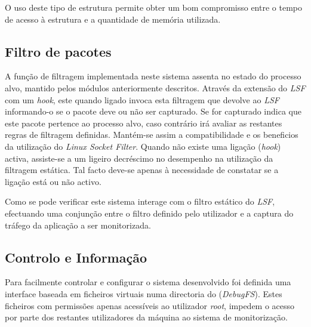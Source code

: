   O uso deste tipo de estrutura permite obter um bom compromisso entre o tempo de acesso à estrutura e a quantidade de memória utilizada.


\subsection{Filtro de pacotes}
\label{sub:packet_filter}

A função de filtragem implementada neste sistema assenta no estado do processo alvo, mantido pelos módulos anteriormente descritos.
Através da extensão do \textit{LSF} com um \textit{hook}, este quando ligado invoca esta filtragem que devolve ao \textit{LSF} informando-o se o pacote deve ou não ser capturado.
Se for capturado indica que este pacote pertence ao processo alvo, caso contrário irá avaliar as restantes regras de filtragem definidas.
Mantém-se assim a compatibilidade e os beneficios da utilização do \textit{Linux Socket Filter}.
Quando não existe uma ligação (\textit{hook}) activa, assiste-se a um ligeiro decréscimo no desempenho na utilização da filtragem estática.
Tal facto deve-se apenas à necessidade de constatar se a ligação está ou não activo.

Como se pode verificar este sistema interage com o filtro estático do \textit{LSF}, efectuando uma conjunção entre o filtro definido pelo utilizador e a captura do tráfego da aplicação a ser monitorizada.


\subsection{Controlo e Informação}
\label{sub:data_information}

Para facilmente controlar e configurar o sistema desenvolvido foi definida uma interface baseada em ficheiros virtuais numa directoria do (\textit{DebugFS}).
Estes ficheiros com permissões apenas acessíveis ao utilizador \textit{root}, impedem o acesso por parte dos restantes utilizadores da máquina ao sistema de monitorização.



